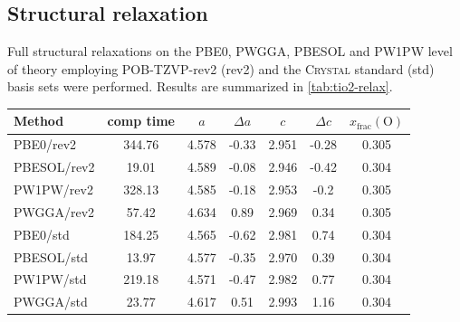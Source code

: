 \documentclass[a4paper,12pt]{scrartcl}
\begin{document}
\subsection{Structural relaxation}
%
Full structural relaxations on the PBE0, PWGGA, PBESOL\autocite[]{pbesol} and PW1PW level of theory employing POB-TZVP-rev2 (rev2) and the \textsc{Crystal} standard (std) basis sets were performed. Results are summarized in \autoref{tab:tio2-relax}.
%
\begin{table}[H]
	\centering
	\label{tab:tio2-relax}
	\begin{tabular}{lcccccc}
		\toprule
		Method      & comp time & $a$   & $\Delta a $ & $c$   & $\Delta c$ & $x_\mathrm{frac} \mathrm{(O)}$ \\
		\midrule
		PBE0/rev2   & 344.76    & 4.578 & -0.33       & 2.951 & -0.28      & 0.305                          \\
		PBESOL/rev2 & 19.01     & 4.589 & -0.08       & 2.946 & -0.42      & 0.304                          \\
		PW1PW/rev2  & 328.13    & 4.585 & -0.18       & 2.953 & -0.2       & 0.305                          \\
		PWGGA/rev2  & 57.42     & 4.634 & 0.89        & 2.969 & 0.34       & 0.305                          \\
		PBE0/std    & 184.25    & 4.565 & -0.62       & 2.981 & 0.74       & 0.304                          \\
		PBESOL/std  & 13.97     & 4.577 & -0.35       & 2.970 & 0.39       & 0.304                          \\
		PW1PW/std   & 219.18    & 4.571 & -0.47       & 2.982 & 0.77       & 0.304                          \\
		PWGGA/std   & 23.77     & 4.617 & 0.51        & 2.993 & 1.16       & 0.304                          \\
		\bottomrule
	\end{tabular}
\end{table}
%
\end{document}
